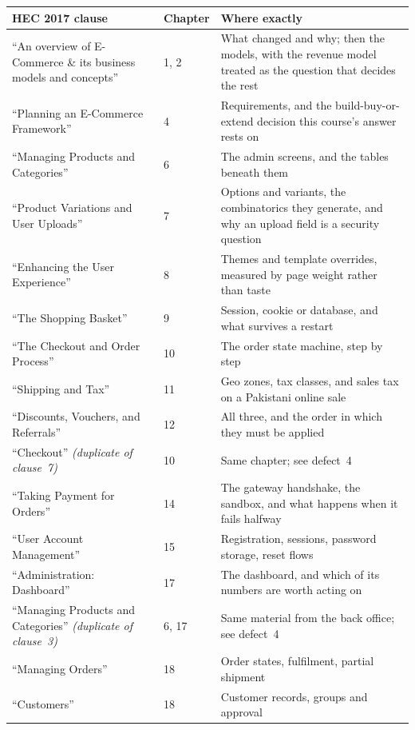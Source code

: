 \begin{longtable}{@{}L{6.4cm}L{2.0cm}L{6.6cm}@{}}
\toprule
{}
\textbf{HEC 2017 clause} & \textbf{Chapter} & \textbf{Where exactly} \\
\midrule
\endhead
``An overview of E-Commerce \& its business models and concepts'' & 1, 2 & What
changed and why; then the models, with the revenue model treated as the
question that decides the rest \\
``Planning an E-Commerce Framework'' & 4 & Requirements, and the
build-buy-or-extend decision this course's answer rests on \\
``Managing Products and Categories'' & 6 & The admin screens, and the tables
beneath them \\
``Product Variations and User Uploads'' & 7 & Options and variants, the
combinatorics they generate, and why an upload field is a security question \\
``Enhancing the User Experience'' & 8 & Themes and template overrides, measured
by page weight rather than taste \\
``The Shopping Basket'' & 9 & Session, cookie or database, and what survives a
restart \\
``The Checkout and Order Process'' & 10 & The order state machine, step by
step \\
``Shipping and Tax'' & 11 & Geo zones, tax classes, and sales tax on a
Pakistani online sale \\
``Discounts, Vouchers, and Referrals'' & 12 & All three, and the order in which
they must be applied \\
``Checkout'' \emph{(duplicate of clause~7)} & 10 & Same chapter; see defect~4 \\
``Taking Payment for Orders'' & 14 & The gateway handshake, the sandbox, and
what happens when it fails halfway \\
``User Account Management'' & 15 & Registration, sessions, password storage,
reset flows \\
``Administration: Dashboard'' & 17 & The dashboard, and which of its numbers
are worth acting on \\
``Managing Products and Categories'' \emph{(duplicate of clause~3)} & 6, 17 &
Same material from the back office; see defect~4 \\
``Managing Orders'' & 18 & Order states, fulfilment, partial shipment \\
``Customers'' & 18 & Customer records, groups and approval \\

\end{longtable}
